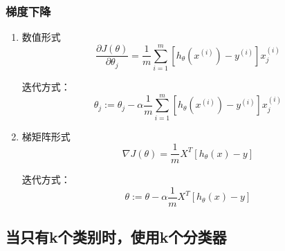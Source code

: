 \subsubsection{梯度下降}
\begin{enumerate}
\item 数值形式
\begin{equation}
	\frac{\partial J(\theta)}{\partial \theta_j} =
	    \frac{1}{m} \sum_{i=1}^m \left[h_\theta(x^{(i)}) - y^{(i)}\right] x_j^{(i)}
\end{equation}

迭代方式：
\begin{equation}
	\theta_j :=
	    \theta_j - \alpha \frac{1}{m} \sum_{i=1}^m \left[h_\theta(x^{(i)}) - y^{(i)}\right] x_j^{(i)}
\end{equation}

\item 梯矩阵形式
\begin{equation}
	\nabla J(\theta) = \frac{1}{m} X^T \left[h_\theta(x) - y\right]
\end{equation}

迭代方式：
\begin{equation}
	\theta := \theta - \alpha \frac{1}{m} X^T \left[h_\theta(x) - y\right]
\end{equation}
\end{enumerate}



\subsection{当只有k个类别时，使用k个分类器}

